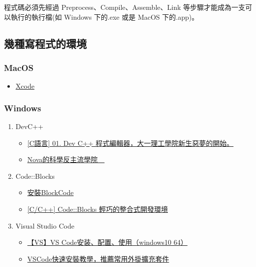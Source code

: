 \documentclass[12pt,a4paper]{article}
\begin{document}
程式碼必須先經過 Preprocess、Compile、Assemble、Link 等步驟才能成為一支可以執行的執行檔(如 Windows 下的.exe 或是 MacOS 下的.app)。

\subsection{幾種寫程式的環境}
\label{sec:orgf2b9ba5}
\subsubsection{MacOS}
\label{sec:orgad5e66d}
\begin{itemize}
\item \href{https://developer.apple.com/xcode/}{Xcode}
\end{itemize}
\subsubsection{Windows}
\label{sec:org13c8e6c}
\begin{enumerate}
\item DevC++
\label{sec:orgcff28bb}
\begin{itemize}
\item \href{https://progressbar.tw/posts/7}{[C語言] 01. Dev C++ 程式編輯器，大一理工學院新生惡夢的開始。}
\item \href{http://selfinquiring.hatenablog.com/entry/2016/03/18/204352}{Nova的科學反主流學院　}
\end{itemize}
\item Code::Blocks
\label{sec:orgf6d3f4f}
\begin{itemize}
\item \href{https://blog.csdn.net/DongChengRong/article/details/78624068}{安裝BlockCode}
\item \href{https://mks.tw/1053/cc-codeblocks-\%E8\%BC\%95\%E5\%B7\%A7\%E7\%9A\%84\%E6\%95\%B4\%E5\%90\%88\%E5\%BC\%8F\%E9\%96\%8B\%E7\%99\%BC\%E7\%92\%B0\%E5\%A2\%83}{[C/C++] Code::Blocks 輕巧的整合式開發環境}
\end{itemize}
\item Visual Studio Code
\label{sec:orgb927c5d}
\begin{itemize}
\item \href{https://blog.csdn.net/HelloZEX/article/details/84029810}{【VS】VS Code安装、配置、使用（windows10 64）}
\item \href{https://tw.alphacamp.co/blog/visual-studio-code-editor-tutorial-and-extensions}{VSCode快速安裝教學，推薦常用外掛擴充套件}
\end{itemize}
\end{enumerate}
\end{document}

